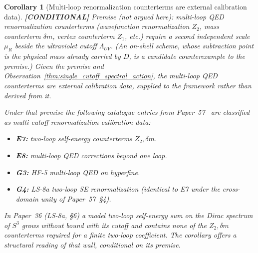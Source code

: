 \documentclass[11pt]{article}
\newtheorem{corollary}{Corollary}
\begin{document}
\begin{corollary}[Multi-loop renormalization counterterms are external calibration data]
\label{cor:multi_loop_renormalization_wall}
\textbf{[CONDITIONAL]} \emph{Premise (not argued here):} multi-loop QED
renormalization counterterms (wavefunction renormalization $Z_2$, mass
counterterm $\delta m$, vertex counterterm $Z_1$, etc.) require a
second independent scale $\mu_R$ beside the ultraviolet cutoff
$\Lambda_{UV}$.  (An on-shell scheme, whose subtraction point is the
physical mass already carried by $D$, is a candidate counterexample to
the premise.)  Given the premise and
Observation~\ref{thm:single_cutoff_spectral_action}, the multi-loop QED
counterterms are external calibration data, supplied to the framework
rather than derived from it.

Under that premise the following catalogue entries from
Paper~57~\cite{paper57} are classified as multi-cutoff
renormalization calibration data:
\begin{itemize}\setlength{\itemsep}{2pt}
\item \textbf{E7:} two-loop self-energy counterterms $Z_2, \delta m$.
\item \textbf{E8:} multi-loop QED corrections beyond one loop.
\item \textbf{G3:} HF-5 multi-loop QED on hyperfine.
\item \textbf{G4:} LS-8a two-loop SE renormalization (identical to E7
  under the cross-domain unity of Paper~57~\S 4).
\end{itemize}

In Paper~36 (LS-8a, \S 6) a model two-loop self-energy sum on the
Dirac spectrum of $S^3$ grows without bound with its cutoff and
contains none of the $Z_2, \delta m$ counterterms required for a finite
two-loop coefficient.  The corollary offers a structural reading of that
wall, conditional on its premise.
\end{corollary}
\end{document}
